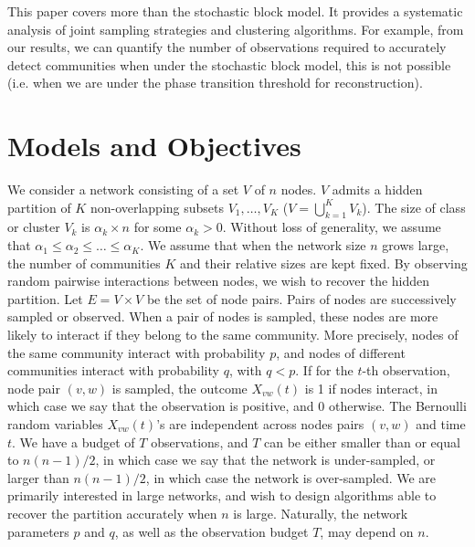 \documentclass[12pt]{colt}%
\begin{document}
This paper covers more than the stochastic block model. It provides a systematic analysis of joint sampling strategies and clustering algorithms. For example, from our results, we can quantify the number of observations required to accurately detect communities when under the stochastic block model, this is not possible (i.e. when we are under the phase transition threshold for reconstruction).

\section{Models and Objectives}\label{sec:model}

We consider a network consisting of a set $V$ of $n$ nodes. $V$ admits a hidden partition of $K$ non-overlapping subsets $V_1,\ldots,V_K$ ($V=\bigcup_{k=1}^KV_k$). The size of class or cluster $V_k$ is $\alpha_k\times n$ for some $\alpha_k>0$. Without loss of generality, we assume that $\alpha_1 \le \alpha_2 \le \dots \le \alpha_K$. We assume that when the network size $n$ grows large, the number of communities $K$ and their relative sizes are kept fixed. By observing random pairwise interactions between nodes, we wish to recover the hidden partition. Let $E=V\times V$ be the set of node pairs. Pairs of nodes are successively sampled or observed. When a pair of nodes is sampled, these nodes are more likely to interact if they belong to the same community. More precisely, nodes of the same community interact with probability $p$, and nodes of different communities interact with probability $q$, with $q<p$. If for the $t$-th observation, node pair $(v,w)$ is sampled, the outcome $X_{vw}(t)$ is 1 if nodes interact, in which case we say that the observation is positive, and 0 otherwise. The Bernoulli random variables $X_{vw}(t)$'s are independent across nodes pairs $(v,w)$ and time $t$. We have a budget of $T$ observations, and $T$ can be either smaller than or equal to $n(n-1)/2$, in which case we say that the network is under-sampled, or larger than $n(n-1)/2$, in which case the network is over-sampled. We are primarily interested in large networks, and wish to design algorithms able to recover the partition accurately when $n$ is large. Naturally, the network parameters $p$ and $q$, as well as the observation budget $T$, may depend on $n$. 
\end{document}
